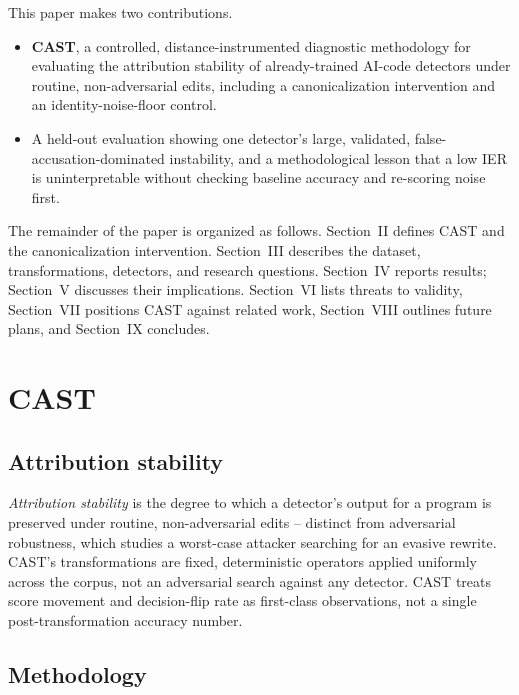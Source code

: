 \documentclass[10pt,conference]{IEEEtran}
\begin{document}
This paper makes two contributions.
\begin{itemize}
\item \textbf{CAST}, a controlled, distance-instrumented diagnostic methodology for evaluating the attribution stability of already-trained AI-code detectors under routine, non-adversarial edits, including a canonicalization intervention and an identity-noise-floor control.
\item A held-out evaluation showing one detector's large, validated, false-accusation-dominated instability, and a methodological lesson that a low IER is uninterpretable without checking baseline accuracy and re-scoring noise first.
\end{itemize}

The remainder of the paper is organized as follows. Section~II defines CAST and the canonicalization intervention. Section~III describes the dataset, transformations, detectors, and research questions. Section~IV reports results; Section~V discusses their implications. Section~VI lists threats to validity, Section~VII positions CAST against related work, Section~VIII outlines future plans, and Section~IX concludes.

\section{CAST}

\subsection{Attribution stability}

\emph{Attribution stability} is the degree to which a detector's output for a program is preserved under routine, non-adversarial edits -- distinct from adversarial robustness, which studies a worst-case attacker searching for an evasive rewrite. CAST's transformations are fixed, deterministic operators applied uniformly across the corpus, not an adversarial search against any detector. CAST treats score movement and decision-flip rate as first-class observations, not a single post-transformation accuracy number.

\subsection{Methodology}
\end{document}
